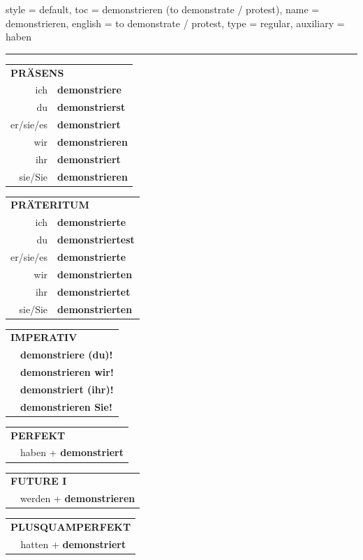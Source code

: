 \begin{verbentry}{
  style = {default},
  toc = {demonstrieren (to demonstrate / protest)},
  name = {demonstrieren},
  english = {to demonstrate / protest},
  type = {regular},
  auxiliary = {haben}
}


\vspace{5pt}
\hrule
\vspace{5pt}

\begin{tabular}{rl}
\multicolumn{2}{l}{\textbf{PRÄSENS}}\\
ich & \textbf{demonstriere}\\
du & \textbf{demonstrierst}\\
er/sie/es & \textbf{demonstriert}\\
wir & \textbf{demonstrieren}\\
ihr & \textbf{demonstriert}\\
sie/Sie & \textbf{demonstrieren}\\
\end{tabular}
\hfill
\begin{tabular}{rl}
\multicolumn{2}{l}{\textbf{PRÄTERITUM}}\\
ich & \textbf{demonstrierte}\\
du & \textbf{demonstriertest}\\
er/sie/es & \textbf{demonstrierte}\\
wir & \textbf{demonstrierten}\\
ihr & \textbf{demonstriertet}\\
sie/Sie & \textbf{demonstrierten}\\
\end{tabular}
\hfill
\begin{tabular}{rl}
\multicolumn{2}{l}{\textbf{IMPERATIV}}\\
& \textbf{demonstriere (du)!}\\
& \textbf{demonstrieren wir!}\\
& \textbf{demonstriert (ihr)!}\\
& \textbf{demonstrieren Sie!}\\
\end{tabular}

\vspace{10pt}

\begin{tabular}{rl}
\multicolumn{2}{l}{\textbf{PERFEKT}}\\
& haben + \textbf{demonstriert}\\
\end{tabular}
\hfill
\begin{tabular}{rl}
\multicolumn{2}{l}{\textbf{FUTURE I}}\\
& werden + \textbf{demonstrieren}\\
\end{tabular}
\hfill
\begin{tabular}{rl}
\multicolumn{2}{l}{\textbf{PLUSQUAMPERFEKT}}\\
& hatten + \textbf{demonstriert}\\
\end{tabular}


\end{verbentry}
